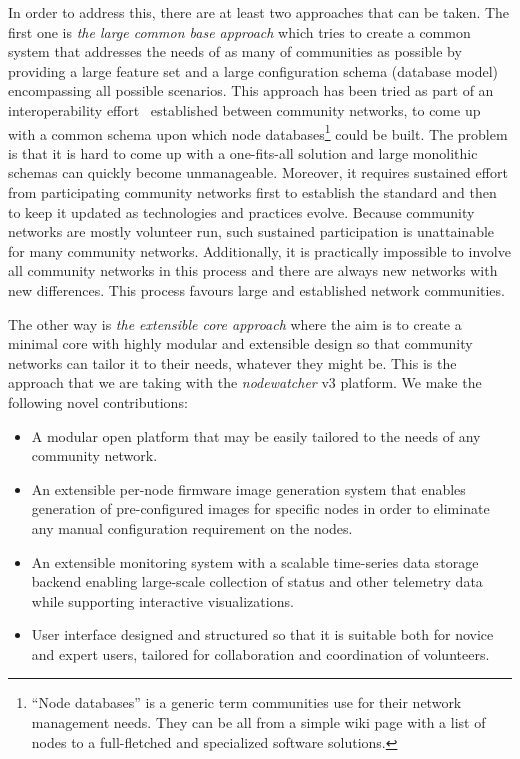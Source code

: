 \documentclass[5p,sort&compress]{elsarticle}
\newcommand{\nodewatcher}{\textit{nodewatcher}}
\begin{document}
In order to address this, there are at least two approaches that can be taken.
The first one is \textit{the large common base approach} which tries to create a common system that addresses the needs of as many of communities as possible by providing a large feature set and a large configuration schema (database model) encompassing all possible scenarios.
This approach has been tried as part of an interoperability effort~\cite{interop_2010, cnml_2007} established between community networks, to come up with a common schema upon which node databases\footnote{``Node databases'' is a generic term communities use for their network management needs. They can be all from a simple wiki page with a list of nodes to a full-fletched and specialized software solutions.} could be built.
The problem is that it is hard to come up with a one-fits-all solution and large monolithic schemas can quickly become unmanageable.
Moreover, it requires sustained effort from participating community networks first to establish the standard and then to keep it updated as technologies and practices evolve.
Because community networks are mostly volunteer run, such sustained participation is unattainable for many community networks.
Additionally, it is practically impossible to involve all community networks in this process and there are always new networks with new differences.
This process favours large and established network communities.

The other way is \textit{the extensible core approach} where the aim is to create a minimal core with highly modular and extensible design so that community networks can tailor it to their needs, whatever they might be.
This is the approach that we are taking with the \nodewatcher{} v3 platform.
We make the following novel contributions:
\begin{itemize}
\item A modular open platform that may be easily tailored to the needs of any community network.
\item An extensible per-node firmware image generation system that enables generation of pre-configured images for specific nodes in order to eliminate any manual configuration requirement on the nodes.
\item An extensible monitoring system with a scalable time-series data storage backend enabling large-scale collection of status and other telemetry data while supporting interactive visualizations.
\item User interface designed and structured so that it is suitable both for novice and expert users, tailored for collaboration and coordination of volunteers.
\end{itemize}
\end{document}

